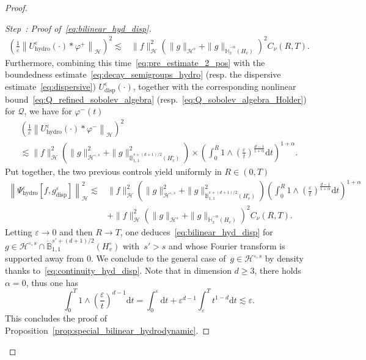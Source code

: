 \documentclass[10pt]{amsart}
\theoremstyle{definition}\newtheorem{defi}[theo]{Definition}\newtheorem{rema}[theo]{Remark}\newtheorem{exam}[theo]{Example}\newtheorem{exem}[theo]{Example}\newtheorem{nota}[theo]{Notation}
\newcommand{\hyd}{\mathrm{hydro}}
\renewcommand{\d}{\mathrm{d}}
\newcommand{\disp}{\mathrm{disp}}
\newcommand{\bbH}{\mathbb{H}}
\newcommand{\bbB}{\mathbb{B}}
\newcommand{\HH}{\mathcal{H}}
\newcommand{\QQ}{\mathcal{Q}}
\newcommand{\HHH}{\mathscr{H}}
\newcommand{\Ss}{H}
\newcommand{\Ssm}{H^{\circ}}
\newcommand{\rSSs}[1]{\HH^{#1}}
\newcommand{\rSSsm}[1]{\HH^{{\circ}, #1}}
\newcommand{\SSSs}{\HHH}
\renewcommand*\ge{\geqslant}
\newcommand*\eps{{\varepsilon}}
\newcounter{stepcount}
\newenvironment{step}[1]{\refstepcounter{stepcount}\begin{proof}[Step~\thestepcount: #1]}{\let\qed\relax\end{proof}}
\begin{document}
\begin{proof}
\begin{step}{{Proof of~\eqref{eq:bilinear_hyd_disp}}}
\begin{align*}
\left(\frac{1}{\eps} \left\| U^\eps_\hyd(\cdot) * \varphi^+ \right\|_\SSSs\right)^2 \lesssim &
\| f \|_{ \SSSs}^2 \left(\| g \|_{ \rSSs{s} } + \| g \|_{ \dot{\bbH}^{-\alpha}_x \left(\Ss_v \right) } \right)^2 C_\nu(R, T).
\end{align*}
Furthermore, combining this time~\eqref{eq:pre_estimate_2_pos} with the boundedness estimate~\eqref{eq:decay_semigroups_hydro} (resp. the dispersive estimate~\eqref{eq:dispersive}) $U^\eps_\disp(\cdot)$, together with the corresponding nonlinear bound~\eqref{eq:Q_refined_sobolev_algebra} (resp.~\eqref{eq:Q_sobolev_algebra_Holder}) for $\QQ$, we have for $\varphi^-(t)$
\begin{multline}\label{eq:continuity_hyd_disp_vanish}
\left(\frac{1}{\eps} \left\| U^\eps_\hyd(\cdot) * \varphi^-\right\|_\SSSs \right)^2
\\
\lesssim \| f \|_{\SSSs}^2 \left(\| g \|_{ \rSSsm{s} }^2 + \| g \|_{ \dot{\bbB}^{s + (d+1)/2 }_{1, 1} \left(\Ssm_v \right) }^2 \right)
\times \left(\int_0^R 1 \land \left(\frac{\eps}{t}\right)^{\frac{d-1}{1+\alpha}} \d t\right)^{1+\alpha}.
\end{multline}
Put together, the two previous controls yield uniformly in $R \in (0, T)$
\begin{align*}
\left\| \Psi^\eps_\hyd\left[f, g^\eps_\disp\right] \right\|_\SSSs^2 \lesssim &
\| f \|_{\SSSs}^2 \left(\| g \|_{ \rSSsm{s} }^2 + \| g \|_{ \dot{\bbB}^{s + (d+1)/2 }_{1, 1} \left(\Ssm_v \right) }^2 \right) \left(\int_0^{R} 1 \land \left(\frac{\eps}{t}\right)^{\frac{d-1}{1+\alpha}} \d t\right)^{1+\alpha} \\
& + \| f \|_{ \SSSs}^2 \left(\| g \|_{ \rSSs{s} } + \| g \|_{ \dot{\bbH}^{-\alpha}_x \left(\Ss_v \right) } \right)^2 C_\nu(R, T).
\end{align*}
Letting $\eps \to 0$ and then $R \to T$, one deduces~\eqref{eq:bilinear_hyd_disp} for $g \in \rSSsm{s} \cap \dot{\bbB}^{s' + (d+1)/2 }_{1, 1} (\Ssm_v)$ with~$s' > s$ and whose Fourier transform is supported away from $0$. We conclude to the general case of~$g \in \rSSsm{s}$ by density thanks to~\eqref{eq:continuity_hyd_disp}. Note that in dimension $d \ge 3$, there holds $\alpha = 0$, thus one has
\[
\int_0^T 1 \land \left(\frac{\eps}{t}\right)^{d-1} \d t =\int_0^\eps \d t+ \eps^{d-1}\int_{\eps}^T t^{1-d}\d t \lesssim \eps.
\]
This concludes the proof of Proposition~\ref{prop:special_bilinear_hydrodynamic}.\qedhere
\end{step}\let\qed\relax
\end{proof}
\end{document}
